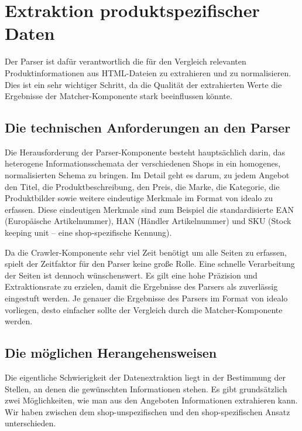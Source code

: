 \section{Extraktion produktspezifischer Daten}
\label{sec:extraktion-produktspezifischer-daten}

Der Parser ist dafür verantwortlich die für den Vergleich relevanten Produktinformationen aus HTML-Dateien zu
extrahieren und zu normalisieren.
Dies ist ein sehr wichtiger Schritt, da die Qualität der extrahierten Werte die Ergebnisse der Matcher-Komponente
stark beeinflussen könnte.

\subsection{Die technischen Anforderungen an den Parser}
\label{subsec:technische-anforderungen-parser}

Die Herausforderung der Parser-Komponente besteht hauptsächlich darin, das heterogene Informationsschemata der
verschiedenen Shops in ein homogenes, normalisierten Schema zu bringen.
Im Detail geht es darum, zu jedem Angebot den Titel, die Produktbeschreibung, den Preis, die Marke, die Kategorie,
die Produktbilder sowie weitere eindeutige Merkmale im Format von idealo zu erfassen.
Diese eindeutigen Merkmale sind zum Beispiel die standardisierte EAN (Europäische Artikelnummer), HAN (Händler
Artikelnummer) und SKU (Stock keeping unit -- eine shop-spezifische Kennung).

Da die Crawler-Komponente sehr viel Zeit benötigt um alle Seiten zu erfassen, spielt der Zeitfaktor für den Parser
keine große Rolle.
Eine schnelle Verarbeitung der Seiten ist dennoch wünschenswert.
Es gilt eine hohe Präzision und Extraktionsrate zu erzielen, damit die Ergebnisse des Parsers als zuverlässig
eingestuft werden.
Je genauer die Ergebnisse des Parsers im Format von idealo vorliegen, desto einfacher sollte der Vergleich durch die
Matcher-Komponente werden.

\subsection{Die möglichen Herangehensweisen}
\label{subsec:herangehensweisen}

Die eigentliche Schwierigkeit der Datenextraktion liegt in der Bestimmung der Stellen, an denen die gewünschten
Informationen stehen.
Es gibt grundsätzlich zwei Möglichkeiten, wie man aus den Angeboten Informationen extrahieren kann.
Wir haben zwischen dem shop-unspezifischen und den shop-spezifischen Ansatz unterschieden.

